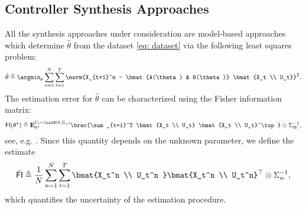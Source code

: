 \subsection{Controller Synthesis Approaches}
\label{s: methods}


All the synthesis approaches under consideration are model-based approaches which determine $\hat \theta$ from the dataset \eqref{eq: dataset} via the following least squares problem:
\begin{align}
    \label{eq: least squares}
    \hat \theta \triangleq \argmin_{\theta} \sum_{n=1}^N \sum_{t=1}^T \norm{X_{t+1}^n - \bmat{A(\theta) & B(\theta)} \bmat{X_t \\ U_t}}^2. 
\end{align}
The estimation error for $\hat \theta$ can be characterized using the Fisher information matrix:
\begin{align}
    \mathsf{FI}(\theta^\star) \triangleq \mathbf{E}_{\theta^\star}^{U_t \sim \calN(0, \Sigma_u)} \brac{\sum_{t=1}^T \bmat{X_t \\ U_t} \bmat{X_t \\ U_t}^\top } \otimes \Sigma_W^{-1}, \label{eq:FI}
\end{align}
see, e.g. \citet{lee2024active}. Since this quantity depends on the unknown parameter, we define the estimate
\begin{align}
     \label{eq: fisher estimate}
    \hat{\mathsf{FI}} \triangleq \frac{1}{N}\sum_{n=1}^N \sum_{t=1}^T \bmat{X_t^n \\ U_t^n } \bmat{X_t^n \\ U_t^n}^\top \otimes \Sigma_w^{-1},
\end{align}
which quantifies the uncertainty of the estimation procedure. 

